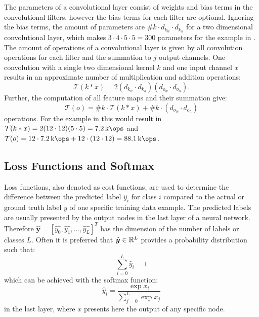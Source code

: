 The parameters of a convolutional layer consist of weights and bias terms in the convolutional filters, however the bias terms for each filter are optional.
Ignoring the bias terms, the amount of parameters are $\#k \cdot d_{k_w} \cdot d_{k_h}$ for a two dimensional convolutional layer, which makes $3 \cdot 4 \cdot 5 \cdot 5 = 300$ parameters for the example in .
The amount of operations of a convolutional layer is given by all convolution operations for each filter and the summation to $j$ output channels.
One convolution with a single two dimensional kernel $k$ and one input channel $x$ results in an approximate number of multiplication and addition operations:
\begin{equation}
  \mathcal{T}(k * x) = 2(d_{k_w} \cdot d_{k_h}) (d_{o_w} \cdot d_{o_h}).
\end{equation}
Further, the computation of all feature maps and their summation give:
\begin{equation}
  \mathcal{T}(o) = \#k \cdot \mathcal{T}(k * x) + \#k \cdot (d_{o_w} \cdot d_{o_h})
\end{equation}
operations.
For the example in  this would result in $\mathcal{T}(k * x) = 2 (12 \cdot 12) (5 \cdot 5) = \SI{7.2}{\kilo\ops}$ and $\mathcal{T}(o) = 12 \cdot \SI{7.2}{\kilo\ops} + 12 \cdot (12 \cdot 12) = \SI{88.1}{\kilo\ops}$.



\subsection{Loss Functions and Softmax}
Loss functions, also denoted as cost functions, are used to determine the difference between the predicted label $\hat{y}_i$ for class $i$ compared to the actual or ground truth label $y$ of one specific training data example.
The predicted labels are usually presented by the output nodes in the last layer of a neural network.
Therefore $\hat{\bm{y}} = [\hat{y_0}, \hat{y_1}, \dots, \hat{y_L}]^T$ has the dimension of the number of labels or classes $L$.
Often it is preferred that $\hat{\bm{y}} \in \mathbb{R}^L$ provides a probability distribution such that:
\begin{equation}
  \sum_{i=0}^L \hat{y}_i = 1
\end{equation}
which can be achieved with the softmax function:
\begin{equation}\label{eq:nn_theory_softmax}
  \hat{y}_i = \frac{\exp{x_i}}{\sum_{j=0}^{L}\exp{x_j}}
\end{equation}
in the last layer, where $x$ presents here the output of any specific node.

